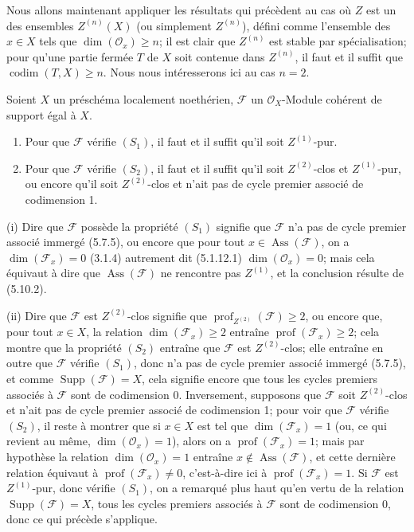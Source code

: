 \begin{env}[5.10.13]
\label{IV.2.s5.10.13-fr}
Nous allons maintenant appliquer les résultats qui précèdent au cas où $Z$ est
un des ensembles $Z^{(n)}(X)$ (ou simplement $Z^{(n)}$), défini comme
l'ensemble des $x\in X$ tels que $\dim(\mathcal O_x)\geq n$; il est clair que
$Z^{(n)}$ est stable par spécialisation; pour qu'une partie fermée $T$ de $X$
soit contenue dans $Z^{(n)}$, il faut et il suffit que
$\operatorname{codim}(T,X)\geq n$. Nous nous intéresserons ici au cas $n=2$.
\end{env}

\begin{proposition}[5.10.14]
\label{IV.2.s5.10.14-fr}
Soient $X$ un préschéma localement noethérien, $\mathcal F$ un
$\mathcal O_X$-Module cohérent de support égal à $X$.
\begin{enumerate}
\item[\textup{(i)}] Pour que $\mathcal F$ vérifie $(S_1)$, il faut et il suffit qu'il
soit $Z^{(1)}$-pur.
\item[\textup{(ii)}] Pour que $\mathcal F$ vérifie $(S_2)$, il faut et il suffit qu'il
soit $Z^{(2)}$-clos et $Z^{(1)}$-pur, ou encore qu'il soit $Z^{(2)}$-clos et
n'ait pas de cycle premier associé de codimension 1.
\end{enumerate}
\end{proposition}

(i) Dire que $\mathcal F$ possède la propriété $(S_1)$ signifie que
$\mathcal F$ n'a pas de cycle premier associé immergé (5.7.5), ou encore que
pour tout $x\in\operatorname{Ass}(\mathcal F)$, on a
$\dim(\mathcal F_x)=0$ (3.1.4) autrement dit (5.1.12.1)
$\dim(\mathcal O_x)=0$; mais cela équivaut à dire que
$\operatorname{Ass}(\mathcal F)$ ne rencontre pas $Z^{(1)}$, et la conclusion
résulte de (5.10.2).

(ii) Dire que $\mathcal F$ est $Z^{(2)}$-clos signifie que
$\operatorname{prof}_{Z^{(2)}}(\mathcal F)\geq2$, ou encore que, pour tout
$x\in X$, la relation $\dim(\mathcal F_x)\geq2$ entraîne
$\operatorname{prof}(\mathcal F_x)\geq2$; cela montre que la propriété $(S_2)$
entraîne que $\mathcal F$ est $Z^{(2)}$-clos; elle entraîne en outre que
$\mathcal F$ vérifie $(S_1)$, donc n'a pas de cycle premier associé immergé
(5.7.5), et comme $\operatorname{Supp}(\mathcal F)=X$, cela signifie encore
que tous les cycles premiers associés à $\mathcal F$ sont de codimension 0.
Inversement, supposons que $\mathcal F$ soit $Z^{(2)}$-clos et n'ait pas de
cycle premier associé de codimension 1; pour voir que $\mathcal F$ vérifie
$(S_2)$, il reste à montrer que si $x\in X$ est tel que
$\dim(\mathcal F_x)=1$ (ou, ce qui revient au même,
$\dim(\mathcal O_x)=1$), alors on a $\operatorname{prof}(\mathcal F_x)=1$;
mais par hypothèse la relation $\dim(\mathcal O_x)=1$ entraîne
$x\notin\operatorname{Ass}(\mathcal F)$, et cette dernière relation équivaut à
$\operatorname{prof}(\mathcal F_x)\neq0$, c'est-à-dire ici à
$\operatorname{prof}(\mathcal F_x)=1$. Si $\mathcal F$ est $Z^{(1)}$-pur,
donc vérifie $(S_1)$, on a remarqué plus haut qu'en vertu de la relation
$\operatorname{Supp}(\mathcal F)=X$, tous les cycles premiers associés à
$\mathcal F$ sont de codimension 0, donc ce qui précède s'applique.

